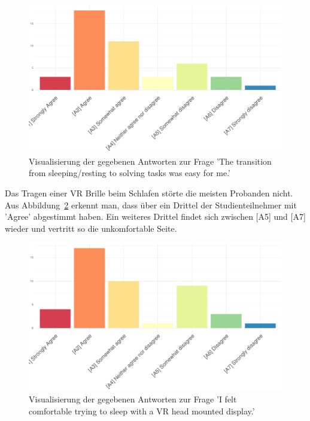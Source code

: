 \begin{figure}[H]
	\centering
	\includegraphics[width=\textwidth]{./_StudyResults/transitionEasy}
	\caption{Visualisierung der gegebenen Antworten zur Frage 'The transition from sleeping/resting to solving tasks was easy for me.'}
	\label{fig:transitionEasy}
\end{figure}

Das Tragen einer VR Brille beim Schlafen störte die meisten Probanden nicht. Aus Abbildung~\ref{fig:comfortableHeadset} erkennt man, dass über ein Drittel der Studienteilnehmer mit 'Agree' abgestimmt haben. Ein weiteres Drittel findet sich zwischen [A5] und [A7] wieder und vertritt so die unkomfortable Seite. 

\begin{figure}[H]
	\centering
	\includegraphics[width=\textwidth]{./_StudyResults/comfortableHeadset}
	\caption{Visualisierung der gegebenen Antworten zur Frage 'I felt comfortable trying to sleep with a VR head mounted display.'}
	\label{fig:comfortableHeadset}
\end{figure}

